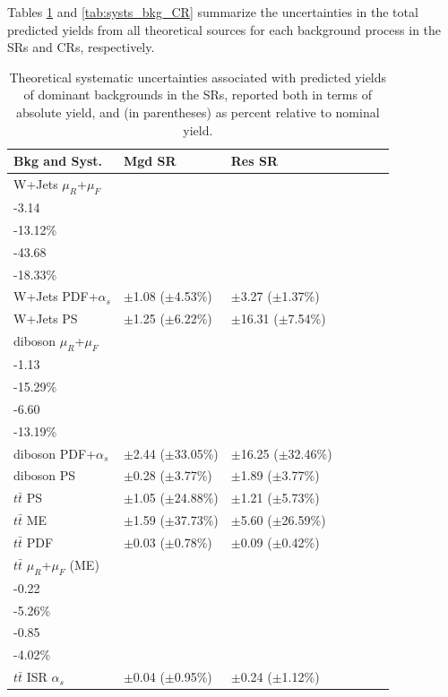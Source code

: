 Tables \ref{tab:systs_bkg_SR} and \ref{tab:systs_bkg_CR} summarize the uncertainties in the total predicted yields from all theoretical sources for each background process in the SRs and CRs, respectively. 

\begin{table}[ht]
\small{
\caption{\label{tab:systs_bkg_SR} Theoretical systematic uncertainties associated with predicted yields of dominant backgrounds in the SRs, reported both in terms of absolute yield, and (in parentheses) as percent relative to nominal yield.}
\begin{tabular}{l l l l l l l }
\toprule
\textbf{Bkg and Syst.} & \textbf{Mgd SR} & \textbf{Res SR}\tabularnewline
\midrule
\midrule
W+Jets \(\mu_R\)+\(\mu_F\) & \(\substack{+6.33\\-3.14}\) \big(\(\substack{+26.45\%\\-13.12\%}\)\big) & \(\substack{+35.68\\-43.68}\) \big(\(\substack{+14.97\%\\-18.33\%}\)\big) \tabularnewline
\midrule
W+Jets PDF+\(\alpha_s\) & \(\pm\)1.08 (\(\pm\)4.53\%) & \(\pm\)3.27 (\(\pm\)1.37\%) \tabularnewline
\midrule
W+Jets PS & \(\pm\)1.25 (\(\pm\)6.22\%) & \(\pm\)16.31 (\(\pm\)7.54\%) \tabularnewline
\midrule
diboson \(\mu_R\)+\(\mu_F\) & \(\substack{+1.29\\-1.13}\) \big(\(\substack{+17.39\%\\-15.29\%}\)\big) & \(\substack{+7.62\\-6.60}\) \big(\(\substack{+15.22\%\\-13.19\%}\)\big) \tabularnewline
\midrule
diboson PDF+\(\alpha_s\) & \(\pm\)2.44 (\(\pm\)33.05\%) &\(\pm\)16.25 (\(\pm\)32.46\%) \tabularnewline
\midrule
diboson PS & \(\pm\)0.28 (\(\pm\)3.77\%) &\(\pm\)1.89 (\(\pm\)3.77\%) \tabularnewline
\midrule
\(t\bar{t}\) PS & \(\pm\)1.05 (\(\pm\)24.88\%) & \(\pm\)1.21 (\(\pm\)5.73\%) \tabularnewline
\midrule
\(t\bar{t}\) ME & \(\pm\)1.59 (\(\pm\)37.73\%) & \(\pm\)5.60 (\(\pm\)26.59\%) \tabularnewline
\midrule
\(t\bar{t}\) PDF & \(\pm\)0.03 (\(\pm\)0.78\%) & \(\pm\)0.09 (\(\pm\)0.42\%) \tabularnewline
\midrule
\(t\bar{t}\) \(\mu_R\)+\(\mu_F\) (ME) & \(\substack{+0.16\\-0.22}\) \big(\(\substack{+3.81\%\\-5.26\%}\)\big) & \(\substack{+0.58\\-0.85}\) \big(\(\substack{+2.74\%\\-4.02\%}\)\big) \tabularnewline
\midrule
\(t\bar{t}\) ISR \(\alpha_s\) & \(\pm\)0.04 (\(\pm\)0.95\%) & \(\pm\)0.24 (\(\pm\)1.12\%) \tabularnewline

\end{tabular}}
\end{table}
